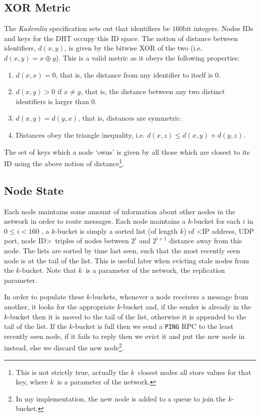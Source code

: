 \documentclass[10pt,twoside,notitlepage,a4paper]{report}
\newcommand{\kademlia}{\emph{Kademlia}}
\newcommand{\K}{$k$}
\begin{document}
	\subsection{XOR Metric}
	The \kademlia{} specification sets out that identifiers be $160$bit integers. Nodes IDs and keys for the DHT occupy this ID space. The notion of distance between identifiers, $d(x,y)$, is given by the bitwise XOR of the two (i.e. $d(x,y) = x \oplus y$). This is a valid metric as it obeys the following properties:
	\begin{enumerate}
		\item $d(x,x) = 0$, that is, the distance from any identifier to itself is $0$.
		\item $d(x,y) > 0$ if $x \neq y$, that is, the  distance between any two distinct identifiers is larger than $0$.
		\item $d(x,y) = d(y,x)$, that is, distances are symmetric.
		\item Distances obey  the triangle inequality, i.e. $d(x,z) \leq d(x,y) + d(y,z)$.
	\end{enumerate}
	The set of keys which a node `owns' is given by all those which are closest to its ID using the above notion of distance\footnote{This is not strictly true, actually the \K~closest nodes all store values for that key, where \K~is a parameter of the network.}.
	
	\subsection{Node State}
	Each node maintains some amount of information about other nodes in the network in order to route messages. Each node maintains a \K-bucket for each $i$ in $0 \leq i < 160$ , a \K-bucket is simply a sorted list (of length \K) of \textless IP address, UDP port, node ID\textgreater~triples of nodes between $2^i$ and $2^{i+1}$ distance away from this node. The lists are sorted by time last seen, such that the most recently seen node is at the tail of the list. This is useful later when evicting stale nodes from the \K-bucket. Note that \K~is a parameter of the network, the replication parameter.
	
	In order to populate these \K-buckets, whenever a node receivers a message from another, it looks for the appropriate \K-bucket and, if the sender is already in the \K-bucket then it is moved to the tail of the list, otherwise it is appended to the tail of the list. If the \K-bucket is full then we send a \texttt{PING} RPC to the least recently seen node, if it fails to reply then we evict it and put the new node in instead, else we discard the new node\footnote{In my implementation, the new node is added to a queue to join the \K-bucket.}.
	
\end{document}

